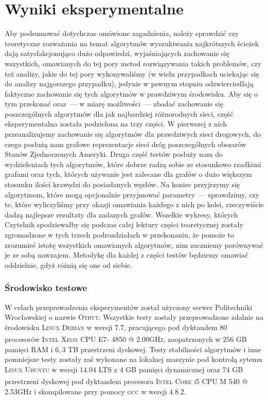 \chapter{Wyniki eksperymentalne}

Aby podsumować dotychczas omówione zagadnienia, należy sprawdzić czy teoretyczne rozważania na temat algorytmów wyszukiwania najkrótszych ścieżek dają satysfakcjonująco dużo odpowiedzi, wyjaśniających zachowanie się wszystkich, omawianych do tej pory metod rozwiązywania takich problemów, czy też analizy, jakie do tej pory wykonywaliśmy (w wielu przypadkach uciekając się do analizy najgorszego przypadku), jedynie w pewnym stopniu odzwierciedlają faktyczne zachowanie się tych algorytmów w prawdziwym środowisku. Aby się o tym przekonać oraz~--- w miarę możliwości~--- zbadać zachowanie się poszczególnych algorytmów dla jak najbardziej różnorodnych sieci, część eksperymentalna została podzielona na trzy części. W pierwszej z nich przeanalizujemy zachowanie się algorytmów dla prawdziwych sieci drogowych, do czego posłużą nam grafowe reprezentacje sieci dróg poszczególnych obszarów Stanów Zjednoczonych Ameryki. Druga część testów posłuży nam do wydzieleniach tych algorytmów, które dobrze radzą sobie ze stosunkowo rzadkimi grafami oraz tych, których używanie jest zalecane dla grafów o dużo większym stosunku ilości krawędzi do posiadanych węzłów. Na koniec przyjrzymy się algorytmom, które mogą opcjonalnie przyjmować parametry~--- sprawdzimy, czy te, które wyliczyliśmy przy okazji omawiania każdego z nich po kolei, rzeczywiście dadzą najlepsze rezultaty dla zadanych grafów. Wszelkie wykresy, których Czytelnik spodziewałby się podczas całej lektury części teoretycznej zostały zgromadzone w tych trzech podrozdziałach w przekonaniu, że pomoże to zrozumieć istotę wszystkich omawianych algorytmów, nim zaczniemy porównywać je ze sobą nawzajem. Metodykę dla każdej z części testów będziemy omawiać oddzielnie, gdyż różnią się one od siebie.

\subsection{Środowisko testowe}

W celach przeprowadzenia eksperymentów został użyczony serwer Politechniki Wrocławskiej o nazwie \textsc{Otryt}. Wszystkie testy zostały przeprowadzone zdalnie na środowisku \textsc{Linux Debian} w wersji $7.7$, pracującego pod dyktandem $80$ procesorów \textsc{Intel\textsuperscript{\textregistered} Xeon\textsuperscript{\textregistered} CPU E7- 4850  @ 2.00GHz}, zaopatrzonych w $256$ \textsc{GB} pamięci \textsc{RAM} i $6,3$ \textsc{TB} przestrzeni dyskowej. Testy stabilności algorytmów i inne pomniejsze testy zostały zaś wykonane na lokalnej maszynie pod kontrolą sytemu \textsc{Linux Ubuntu} w wersji $14.04$ \textsc{LTS} z $4$ \textsc{GB} pamięci dynamicznej oraz $74$ \textsc{GB} przestrzeni dyskowej pod dyktandem procesora \textsc{Intel\textsuperscript{\textregistered} Core\textsuperscript{\texttrademark} i5 CPU M 540  @ 2.53GHz} i skompilowane przy pomocy \textsc{gcc} w wersji $4.8.2$.

